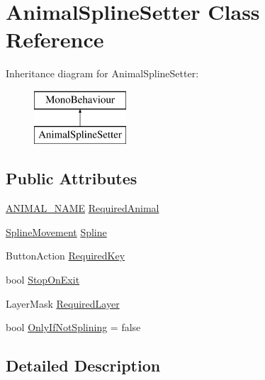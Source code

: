 \hypertarget{class_animal_spline_setter}{}\section{Animal\+Spline\+Setter Class Reference}
\label{class_animal_spline_setter}
Inheritance diagram for Animal\+Spline\+Setter\+:\begin{figure}[H]
\begin{center}
\leavevmode
\includegraphics[height=2.000000cm]{class_animal_spline_setter}
\end{center}
\end{figure}
\subsection*{Public Attributes}
\begin{DoxyCompactItemize}
\item 
\mbox{\hyperlink{_animal_8cs_a2fa5713399b84d1b88dae9196837af50}{A\+N\+I\+M\+A\+L\+\_\+\+N\+A\+ME}} \mbox{\hyperlink{class_animal_spline_setter_a43018c8e3ff452ff7edc468204b0d450}{Required\+Animal}}
\item 
\mbox{\hyperlink{class_spline_movement}{Spline\+Movement}} \mbox{\hyperlink{class_animal_spline_setter_ac4513c94ec6fbc609f2b74945f36318d}{Spline}}
\item 
Button\+Action \mbox{\hyperlink{class_animal_spline_setter_a617064d1b2bac19e5c15d51a157ba7d3}{Required\+Key}}
\item 
bool \mbox{\hyperlink{class_animal_spline_setter_a989e1768f8f6d6d3fe8a2a11f72e145c}{Stop\+On\+Exit}}
\item 
Layer\+Mask \mbox{\hyperlink{class_animal_spline_setter_ae2e2fd2013d81beb87eefebef257c933}{Required\+Layer}}
\item 
bool \mbox{\hyperlink{class_animal_spline_setter_a26cb363f22a2d25040949f44f363bd01}{Only\+If\+Not\+Splining}} = false
\end{DoxyCompactItemize}


\subsection{Detailed Description}


